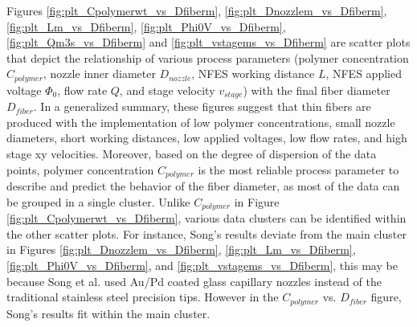 Figures \ref{fig:plt_Cpolymerwt_vs_Dfiberm}, \ref{fig:plt_Dnozzlem_vs_Dfiberm}, \ref{fig:plt_Lm_vs_Dfiberm}, \ref{fig:plt_Phi0V_vs_Dfiberm}, \ref{fig:plt_Qm3s_vs_Dfiberm} and \ref{fig:plt_vstagems_vs_Dfiberm} are scatter plots that depict the relationship of various process parameters (polymer concentration $C_{polymer}$, nozzle inner diameter $D_{nozzle}$, NFES working distance $L$, NFES applied voltage $\Phi_0$, flow rate $Q$, and stage velocity $v_{stage}$) with the final fiber diameter $D_{fiber}$. In a generalized summary, these figures suggest that thin fibers are produced with the implementation of low polymer concentrations, small nozzle diameters, short working distances, low applied voltages, low flow rates, and high stage xy velocities. Moreover, based on the degree of dispersion of the data points, polymer concentration $C_{polymer}$ is the most reliable process parameter to describe and predict the behavior of the fiber diameter, as most of the data can be grouped in a single cluster. Unlike $C_{polymer}$ in Figure \ref{fig:plt_Cpolymerwt_vs_Dfiberm}, various data clusters can be identified within the other scatter plots. For instance, Song's results \cite{Song2015} deviate from the main cluster in Figures \ref{fig:plt_Dnozzlem_vs_Dfiberm}, \ref{fig:plt_Lm_vs_Dfiberm}, \ref{fig:plt_Phi0V_vs_Dfiberm}, and \ref{fig:plt_vstagems_vs_Dfiberm}, this may be because Song et al. used Au/Pd coated glass capillary nozzles instead of the traditional stainless steel precision tips. However in the $C_{polymer}$ vs. $D_{fiber}$ figure, Song's results fit within the main cluster.

